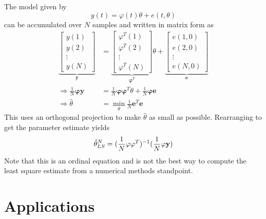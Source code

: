 \documentclass[lecture,12pt,]{pcms-l}
\begin{document}
The model given by
$$y(t) = \varphi(t)\theta + e(t,\theta)$$
can be accumulated over $N$ samples and written in matrix form as
\begin{align*}
\underbrace{\left[\begin{array}{c} y(1) \\ y(2) \\ \vdots \\ y(N) \end{array}\right]}_{\mathbf{y}} &= \underbrace{\left[\begin{array}{c} \varphi^T(1) \\ \varphi^T(2) \\ \vdots \\ \varphi^T(N) \end{array}\right]}_{\mathbf{\varphi}^T} \theta
+ \underbrace{\left[\begin{array}{c} e(1,0) \\ e(2,0) \\ \vdots \\ e(N,0) \end{array}\right]}_{\mathbf{e}} \\
\Rightarrow \frac{1}{N}\mathbf{\varphi}\mathbf{y} &= \frac{1}{N}\mathbf{\varphi}\mathbf{\varphi}^T\theta + \frac{1}{N}\mathbf{\varphi}\mathbf{e} \\
\Rightarrow \hat{\theta} &= \min_\theta \frac{1}{N}\mathbf{e}^T\mathbf{e}
\end{align*}
This uses an orthogonal projection to make $\hat{\theta}$ as small as possible. Rearranging to get the parameter estimate yields
$$\hat{\theta}_{LS}^N = (\frac{1}{N}\mathbf{\varphi\varphi}^T)^{-1} (\frac{1}{N}\mathbf{\varphi y})$$
Note that this is an ordinal equation and is not the best way to compute the least square estimate from a numerical methods standpoint.

\section{Applications}
\end{document}
